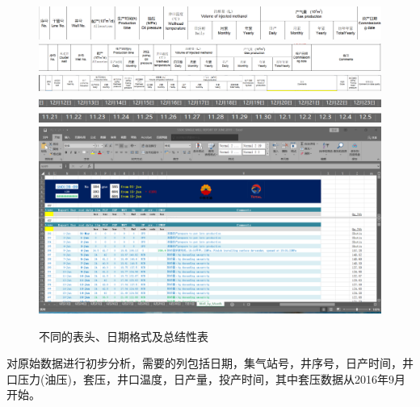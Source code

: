 \begin{figure}[H]
    \centering
    \includegraphics[scale=0.3,angle=0]{figure/表头1.png}
    \hfil
    \includegraphics[scale=0.3,angle=0]{figure/表头2.png}
    \hfil
    \includegraphics[scale=0.25,angle=0]{figure/表头3.png}
    \hfil
    \includegraphics[scale=0.3,angle=0]{figure/日期格式1.png}
    \hfil
    \includegraphics[scale=0.3,angle=0]{figure/日期格式2.png}
    \hfil
    \includegraphics[scale=0.3,angle=0]{figure/总结性表.png}
    \caption{不同的表头、日期格式及总结性表}
    \label{fig:difTable}
\end{figure}

对原始数据进行初步分析，需要的列包括日期，集气站号，井序号，日产时间，井口压力(油压)，套压，井口温度，日产量，投产时间，其中套压数据从2016年9月开始。

